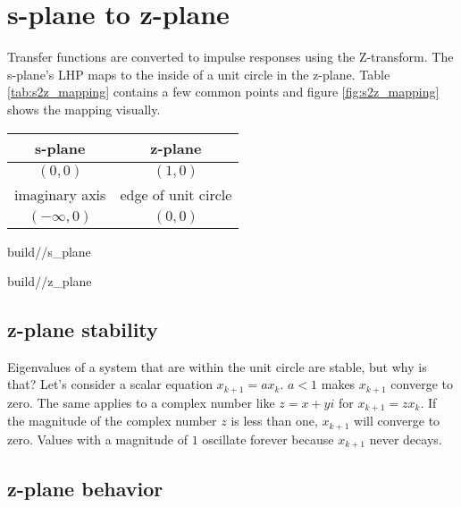 \section{s-plane to z-plane}
\label{sec:s-plane_to_z-plane}

Transfer functions are converted to impulse responses using the Z-transform. The
s-plane's LHP maps to the inside of a unit circle in the z-plane. Table
\ref{tab:s2z_mapping} contains a few common points and figure
\ref{fig:s2z_mapping} shows the mapping visually.
\begin{booktable}
  \begin{tabular}{|cc|}
    \hline
    \rowcolor{headingbg}
    \textbf{s-plane} & \textbf{z-plane} \\
    \hline
    $(0, 0)$ & $(1, 0)$ \\
    imaginary axis & edge of unit circle \\
    $(-\infty, 0)$ & $(0, 0)$ \\
    \hline
  \end{tabular}
  \caption{Mapping from s-plane to z-plane}
  \label{tab:s2z_mapping}
\end{booktable}
\begin{bookfigure}
  \begin{minisvg}{2}{build/\chapterpath/s_plane}
  \end{minisvg}
  \hfill
  \begin{minisvg}{2}{build/\chapterpath/z_plane}
  \end{minisvg}
  \caption{Mapping of axes from s-plane (left) to z-plane (right)}
  \label{fig:s2z_mapping}
\end{bookfigure}

\subsection{z-plane stability}

Eigenvalues of a \gls{system} that are within the unit circle are stable, but
why is that? Let's consider a scalar equation $x_{k + 1} = ax_k$. $a < 1$ makes
$x_{k + 1}$ converge to zero. The same applies to a complex number like
$z = x + yi$ for $x_{k + 1} = zx_k$. If the magnitude of the complex number $z$
is less than one, $x_{k+1}$ will converge to zero. Values with a magnitude of
$1$ oscillate forever because $x_{k+1}$ never decays.

\subsection{z-plane behavior}

